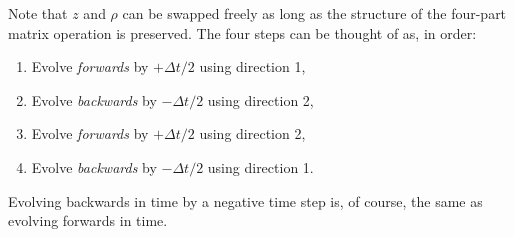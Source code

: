 \documentclass[12pt]{article}
\numberwithin{equation}{section}
\begin{document}
Note that $z$ and $\rho$ can be swapped freely as long as the structure of the four-part matrix operation is preserved. The four steps can be thought of as, in order:
\begin{enumerate}
	\item Evolve \emph{forwards} by $+\Delta t/2$ using direction 1,
	\item Evolve \emph{backwards} by $-\Delta t/2$ using direction 2,
	\item Evolve \emph{forwards} by $+\Delta t/2$ using direction 2,
	\item Evolve \emph{backwards} by $-\Delta t/2$ using direction 1.
\end{enumerate}
Evolving backwards in time by a negative time step is, of course, the same as evolving forwards in time.


\end{document}
